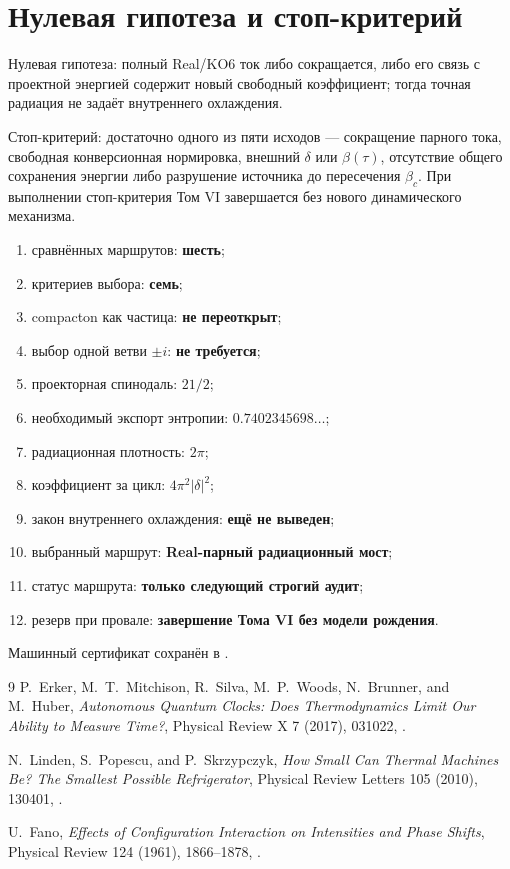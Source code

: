 \section{Нулевая гипотеза и стоп-критерий}

Нулевая гипотеза: полный Real/KO6 ток либо сокращается, либо его связь с
проектной энергией содержит новый свободный коэффициент; тогда точная
радиация не задаёт внутреннего охлаждения.

Стоп-критерий: достаточно одного из пяти исходов --- сокращение парного
тока, свободная конверсионная нормировка, внешний $\delta$ или
$\beta(\tau)$, отсутствие общего сохранения энергии либо разрушение
источника до пересечения $\beta_c$. При выполнении стоп-критерия Том VI
завершается без нового динамического механизма.

\begin{protocol}
\begin{enumerate}
 \item сравнённых маршрутов: \textbf{шесть};
 \item критериев выбора: \textbf{семь};
 \item compacton как частица: \textbf{не переоткрыт};
 \item выбор одной ветви $\pm i$: \textbf{не требуется};
 \item проекторная спинодаль: \textbf{$21/2$};
 \item необходимый экспорт энтропии: \textbf{$0.7402345698\ldots$};
 \item радиационная плотность: \textbf{$2\pi$};
 \item коэффициент за цикл: \textbf{$4\pi^2|\delta|^2$};
 \item закон внутреннего охлаждения: \textbf{ещё не выведен};
 \item выбранный маршрут: \textbf{Real-парный радиационный мост};
 \item статус маршрута: \textbf{только следующий строгий аудит};
 \item резерв при провале: \textbf{завершение Тома VI без модели рождения}.
\end{enumerate}
\end{protocol}

Машинный сертификат сохранён в
.

\begin{thebibliography}{9}
P.~Erker, M.~T.~Mitchison, R.~Silva, M.~P.~Woods, N.~Brunner, and
M.~Huber, \emph{Autonomous Quantum Clocks: Does Thermodynamics Limit Our
Ability to Measure Time?}, Physical Review X 7 (2017), 031022,
.

N.~Linden, S.~Popescu, and P.~Skrzypczyk,
\emph{How Small Can Thermal Machines Be? The Smallest Possible
Refrigerator}, Physical Review Letters 105 (2010), 130401,
.

U.~Fano,
\emph{Effects of Configuration Interaction on Intensities and Phase Shifts},
Physical Review 124 (1961), 1866--1878,
.
\end{thebibliography}